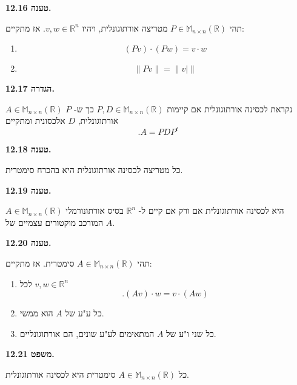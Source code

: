 \documentclass[12pt]{report}
\theoremstyle{plain}
\theoremstyle{definition}
\newcommand{\R}{\mathbb{R}}
\newcommand{\M}{\mathbb{M}}
\newcommand{\0}{\mathbf{0}}
\begin{document}
\noindent\textbf{טענה 12.16.}

תהי
$P\in\M_{n\times n}(\R)$
מטריצה אורתוגונלית, ויהיו
$v,w\in\R^n$. 
אז מתקיים:

\begin{enumerate}[label=\alph*.]
\item
$$
(Pv)\cdot (Pw)=v\cdot w
$$


\item 
$$
\|Pv\|=\|v|\|
$$


\end{enumerate}
\bigskip
\bigskip

\noindent\textbf{הגדרה 12.17.}

$A\in\M_{n\times n}(\R)$
נקראת לכסינה אורתוגונלית אם קיימות
$P,D\in\M_{n\times n}(\R)$
כך ש-
$P$
אורתוגונלית,
$D$
אלכסונית ומתקיים
$$
.A=PDP^t
$$
\bigskip
\bigskip

\noindent\textbf{טענה 12.18.}

כל מטריצה לכסינה אורתוגונלית היא בהכרח סימטרית.
\bigskip
\bigskip

\noindent\textbf{טענה 12.19.}

$A\in\M_{n\times n}(\R)$
היא לכסינה אורתוגונלית אם ורק אם קיים ל-
$\R^n$
בסיס אורתונורמלי המורכב מוקטורים עצמיים של 
$A$.
\bigskip
\bigskip

\noindent\textbf{טענה 12.20.}

תהי
$A\in\M_{n\times n}(\R)$
סימטרית. אז מתקיים:

\begin{enumerate}[label=\alph*.]
\item 
לכל
$v,w\in\R^n$
$$
.(Av)\cdot w=v\cdot (Aw)
$$


\item 
כל ע"ע של
$A$
הוא ממשי.


\item 
כל שני ו"ע של 
$A$
המתאימים לע"ע שונים, הם אורתוגונליים.


\end{enumerate}
\bigskip
\bigskip

\noindent\textbf{משפט 12.21.}

כל 
$A\in\M_{n\times n}(\R)$
סימטרית היא לכסינה אורתוגונלית.
\bigskip
\bigskip
\end{document}
